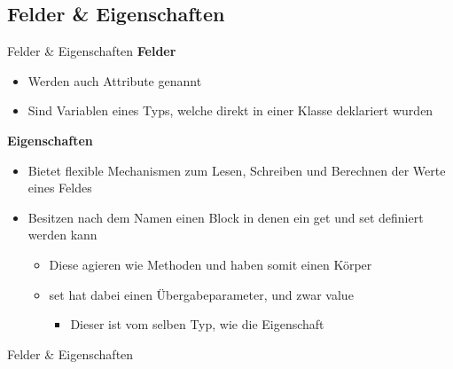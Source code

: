 \subsection{Felder \& Eigenschaften}
\begin{frame}{Felder \& Eigenschaften}
	\textbf{Felder}\\
	\begin{itemize}
		\item Werden auch Attribute genannt
		\item Sind Variablen eines Typs, welche direkt in einer Klasse deklariert wurden
	\end{itemize}
	\textbf{Eigenschaften}\\
	\begin{itemize}
		\item Bietet flexible Mechanismen zum Lesen, Schreiben und Berechnen der Werte eines Feldes
		\item Besitzen nach dem Namen einen Block in denen ein \alert{get} und \alert{set} definiert werden kann
		\begin{itemize}
			\item Diese agieren wie Methoden und haben somit einen Körper
			\item \alert{set} hat dabei einen Übergabeparameter, und zwar \alert{value}
			\begin{itemize}
				\item Dieser ist vom selben Typ, wie die Eigenschaft
			\end{itemize}
		\end{itemize}
	\end{itemize}
\end{frame}

\begin{frame}{Felder \& Eigenschaften}	
	
\end{frame}

